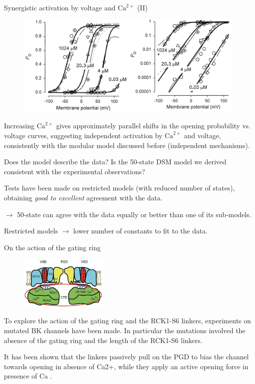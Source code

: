 \documentclass{beamer}
\newcommand{\ca}{\text{Ca}^{2+}}
\begin{document}
\begin{frame}{Synergistic activation by voltage and $\ca$ (II)}
\begin{figure}
\centering
\includegraphics[width=.8\textwidth]{Synergistic_activation_2.png}
\end{figure}

Increasing $\ca$ gives approximately parallel shifts in the opening probability vs. voltage curves, suggesting independent activation by $\ca$ and voltage, consistently with the modular model discussed before (independent mechanisms).
\end{frame}

\begin{frame}{Does the model describe the data?}
Is the 50-state DSM model we derived consistent with the experimental observations?

Tests have been made on restricted models (with reduced number of states), obtaining \emph{good to excellent} agreement with the data.

$\rightarrow$ 50-state can agree with the data equally or better than one of its sub-models.

Restricted models $\rightarrow$ lower number of constants to fit to the data.

\end{frame}

\begin{frame}{On the action of the gating ring}
\begin{figure}
  \begin{center}
    \includegraphics[width=0.38\textwidth]{BK_Cartoon_1.png}
  \end{center}
\end{figure}
To explore the action of the gating ring and the RCK1-S6 linkers, experiments on mutated BK channels have been made. In particular the mutations involved the absence of the gating ring and the length of the RCK1-S6 linkers.

It has been shown that the linkers passively pull on the PGD to bias the channel towards opening in absence of Ca2+, while they apply an active opening force in presence of Ca .

\end{frame}
\end{document}
